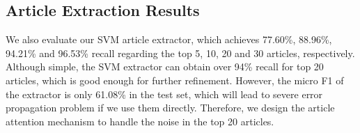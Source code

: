 

\subsection{Article Extraction Results}
We also evaluate our SVM article extractor, which achieves 
77.60\%, 88.96\%, 94.21\% and 96.53\% recall regarding the top 5, 10, 20 and 30 articles, respectively.
Although simple, the SVM extractor can obtain over 94\% recall for top 20 articles, which is good enough for further refinement.
However, the micro F1 of the extractor is only 61.08\% in the test set, which will lead to severe error propagation problem if we use them directly. Therefore, we design the article attention mechanism to handle the noise in the top 20 articles.


